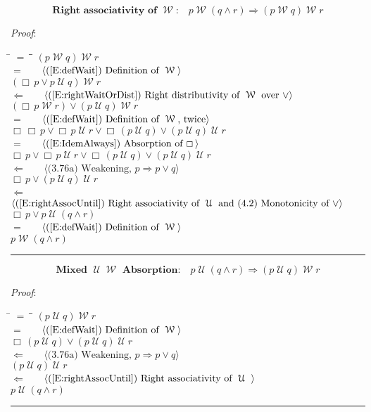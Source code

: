\documentclass[12pt, fleqn, leqno]{article}
\newcommand{\lgap}{2pt}                             %
\newcommand{\mymathindent}{24pt}                    %
\newcommand{\impl}{\ensuremath{\Rightarrow}}        %
\newcommand{\foll}{\ensuremath{\Leftarrow}}         %
\newcommand{\Until}{\;\mathcal{U}\;}
\newcommand{\Wait}{\;\mathcal{W}\;}
\newcommand{\Always}{\Box\,}
\newcommand{\myqed}{\rule[-.23ex]{1.2ex}{2.0ex}}
\newcommand{\myqedtab}{\hspace{384pt}}              %
\newcommand{\Gll} {\langle}                         %
\newcommand{\Ggg} {\rangle}                         %
\newcommand{\Hint}[1]     {\ \ \ $\Gll              \mbox{#1} \Ggg$ }   %
\begin{document}
\begin{equation}\label{E:rightAssocWait}
\textbf{Right associativity of $\Wait$:}\quad p \Wait (q \land r) \impl (p \Wait q) \Wait r
\end{equation}

\emph{Proof}:
\begin{tabbing}
\hspace{\mymathindent} \= $= \;$ \= \myqedtab \= \kill
\> \>   $(p \Wait q) \Wait r$\\[\lgap]
\> $=$ \> \Hint{(\ref{E:defWait}) Definition of $\Wait$} \\[\lgap]
\> \>   $(\Always p \lor p\Until q) \Wait r$\\[\lgap]
\> $\foll$ \> \Hint{(\ref{E:rightWaitOrDist}) Right distributivity of $\Wait$ over $\lor$} \\[\lgap]
\> \>   $(\Always p\Wait r) \lor (p\Until q) \Wait r$\\[\lgap]
\> $=$ \> \Hint{(\ref{E:defWait}) Definition of $\Wait$, twice} \\[\lgap]
\> \>   $\Always\Always p\lor \Always p\Until r \lor \Always(p\Until q)\lor (p\Until q)\Until r$\\[\lgap]
\> $=$  \>  \Hint{(\ref{E:IdemAlways}) Absorption of $\Always$}\\[\lgap]
\> \>   $\Always p\lor \Always p\Until r \lor \Always(p\Until q)\lor (p\Until q)\Until r$\\[\lgap]
\> $\foll$ \> \Hint{(3.76a) Weakening, $p\impl p\lor q$} \\[\lgap]
\> \>   $\Always p\lor (p\Until q)\Until r$\\[\lgap]
\> $\foll$ \> \Hint{(\ref{E:rightAssocUntil}) Right associativity of $\Until$ and (4.2) Monotonicity of $\lor$} \\[\lgap]
\> \>   $\Always p\lor p\Until (q\land r)$\\[\lgap]
\> $=$ \> \Hint{(\ref{E:defWait}) Definition of $\Wait$} \\[\lgap]
\> \>   $p \Wait (q \land r)$ \quad \myqed
\end{tabbing}

\begin{equation}\label{E:mix6untilImpAbsR}
\textbf{Mixed $\Until\Wait$ Absorption:}\quad p \Until (q \land r) \impl (p \Until q) \Wait r
\end{equation}

\emph{Proof}:
\begin{tabbing}
\hspace{\mymathindent} \= $= \;$ \= \myqedtab \= \kill
\> \>   $(p \Until q) \Wait r$\\[\lgap]
\> $=$ \> \Hint{(\ref{E:defWait}) Definition of $\Wait$} \\[\lgap]
\> \>   $\Always (p \Until q) \lor (p \Until q)\Until r$\\[\lgap]
\> $\foll$ \> \Hint{(3.76a) Weakening, $p\impl p\lor q$} \\[\lgap]
\> \>   $(p\Until q)\Until r$\\[\lgap]
\> $\foll$ \> \Hint{(\ref{E:rightAssocUntil}) Right associativity of $\Until$ } \\[\lgap]
\> \>   $p \Until (q \land r)$ \quad \myqed
\end{tabbing}
\end{document}
